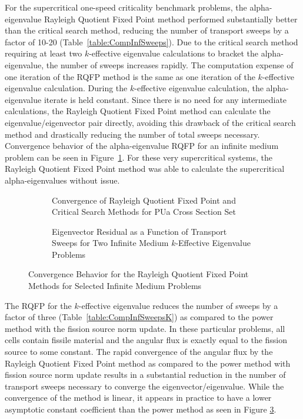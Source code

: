 For the supercritical one-speed criticality benchmark problems, the alpha-eigenvalue Rayleigh Quotient Fixed Point method performed substantially better than the critical search method, reducing the number of transport sweeps by a factor of 10-20 (Table~\ref{table:CompInfSweeps}). Due to the critical search method requiring at least two $k$-effective eigenvalue calculations to bracket the alpha-eigenvalue, the number of sweeps increases rapidly. The computation expense of one iteration of the RQFP method is the same as one iteration of the $k$-effective eigenvalue calculation. During the $k$-effective eigenvalue calculation, the alpha-eigenvalue iterate is held constant. Since there is no need for any intermediate calculations, the Rayleigh Quotient Fixed Point method can calculate the eigenvalue/eigenvector pair directly, avoiding this drawback of the critical search method and drastically reducing the number of total sweeps necessary. Convergence behavior of the alpha-eigenvalue RQFP for an infinite medium problem can be seen in Figure~\ref{fig:AlphaInfConv}. For these very supercritical systems, the Rayleigh Quotient Fixed Point method was able to calculate the supercritical alpha-eigenvalues without issue.

\begin{figure}[!htbp]
	\centering
	\noindent\begin{subfigure}[!htbp]{0.5\textheight}
		\centering
		\resizebox{1.0\textwidth}{!}{
		
	}
	\caption{Convergence of Rayleigh Quotient Fixed Point and Critical Search Methods for PUa Cross Section Set}
	\label{fig:AlphaInfConv}
	\end{subfigure}
	\noindent\begin{subfigure}[!htbp]{0.5\textheight}
	\centering
	\resizebox{1.0\textwidth}{!}{
		
	}
	\caption{Eigenvector Residual as a Function of Transport Sweeps for Two Infinite Medium $k$-Effective Eigenvalue Problems}
	\label{fig:kRes}
	\end{subfigure}
	\caption{Convergence Behavior for the Rayleigh Quotient Fixed Point Methods for Selected Infinite Medium Problems}
\end{figure}

The RQFP for the $k$-effective eigenvalue reduces the number of sweeps by a factor of three (Table~\ref{table:CompInfSweepsK}) as compared to the power method with the fission source norm update. In these particular problems, all cells contain fissile material and the angular flux is exactly equal to the fission source to some constant. The rapid convergence of the angular flux by the Rayleigh Quotient Fixed Point method as compared to the power method with fission source norm update results in a substantial reduction in the number of transport sweeps necessary to converge the eigenvector/eigenvalue. While the convergence of the method is linear, it appears in practice to have a lower asymptotic constant coefficient than the power method as seen in Figure \ref{fig:kRes}.


